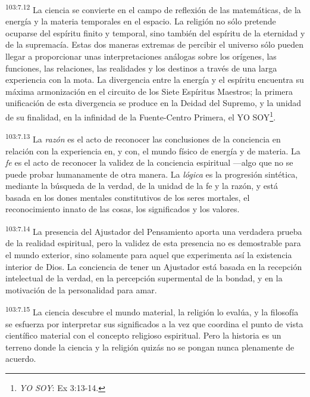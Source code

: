 \par
\textsuperscript{103:7.12} La ciencia se convierte en el campo de reflexión de las matemáticas, de la energía y la materia temporales en el espacio. La religión no sólo pretende ocuparse del espíritu finito y temporal, sino también del espíritu de la eternidad y de la supremacía. Estas dos maneras extremas de percibir el universo sólo pueden llegar a proporcionar unas interpretaciones análogas sobre los orígenes, las funciones, las relaciones, las realidades y los destinos a través de una larga experiencia con la mota. La divergencia entre la energía y el espíritu encuentra su máxima armonización en el circuito de los Siete Espíritus Maestros; la primera unificación de esta divergencia se produce en la Deidad del Supremo, y la unidad de su finalidad, en la infinidad de la Fuente-Centro Primera, el YO SOY\footnote{\textit{YO SOY}: Ex 3:13-14.}.

\par
\textsuperscript{103:7.13} La \textit{razón} es el acto de reconocer las conclusiones de la conciencia en relación con la experiencia en, y con, el mundo físico de energía y de materia. La \textit{fe} es el acto de reconocer la validez de la conciencia espiritual ---algo que no se puede probar humanamente de otra manera. La \textit{lógica} es la progresión sintética, mediante la búsqueda de la verdad, de la unidad de la fe y la razón, y está basada en los dones mentales constitutivos de los seres mortales, el reconocimiento innato de las cosas, los significados y los valores.

\par
\textsuperscript{103:7.14} La presencia del Ajustador del Pensamiento aporta una verdadera prueba de la realidad espiritual, pero la validez de esta presencia no es demostrable para el mundo exterior, sino solamente para aquel que experimenta así la existencia interior de Dios. La conciencia de tener un Ajustador está basada en la recepción intelectual de la verdad, en la percepción supermental de la bondad, y en la motivación de la personalidad para amar.

\par
\textsuperscript{103:7.15} La ciencia descubre el mundo material, la religión lo evalúa, y la filosofía se esfuerza por interpretar sus significados a la vez que coordina el punto de vista científico material con el concepto religioso espiritual. Pero la historia es un terreno donde la ciencia y la religión quizás no se pongan nunca plenamente de acuerdo.

